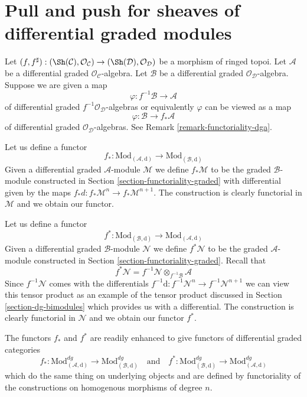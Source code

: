 \section{Pull and push for sheaves of differential graded modules}
\label{section-functoriality-dg}

\noindent
Let $(f, f^\sharp) : (\Sh(\mathcal{C}), \mathcal{O}_\mathcal{C})
\to (\Sh(\mathcal{D}), \mathcal{O}_\mathcal{D})$
be a morphism of ringed topoi. Let $\mathcal{A}$ be a differential
graded $\mathcal{O}_\mathcal{C}$-algebra. Let $\mathcal{B}$ be a
differential graded $\mathcal{O}_\mathcal{D}$-algebra.
Suppose we are given a map
$$
\varphi : f^{-1}\mathcal{B} \to \mathcal{A}
$$
of differential graded $f^{-1}\mathcal{O}_\mathcal{D}$-algebras or equivalently
$\varphi$ can be viewed as a map
$$
\varphi : \mathcal{B} \to f_*\mathcal{A}
$$
of differential graded $\mathcal{O}_\mathcal{D}$-algebras.
See Remark \ref{remark-functoriality-dga}.

\medskip\noindent
Let us define a functor
$$
f_* :
\text{Mod}_{(\mathcal{A}, \text{d})}
\longrightarrow
\text{Mod}_{(\mathcal{B}, \text{d})}
$$
Given a differential graded $\mathcal{A}$-module $\mathcal{M}$ we define
$f_*\mathcal{M}$ to be the graded $\mathcal{B}$-module constructed
in Section \ref{section-functoriality-graded} with differential
given by the maps $f_*d : f_*\mathcal{M}^n \to f_*\mathcal{M}^{n + 1}$.
The construction is clearly functorial in
$\mathcal{M}$ and we obtain our functor.

\medskip\noindent
Let us define a functor
$$
f^* :
\text{Mod}_{(\mathcal{B}, \text{d})}
\longrightarrow
\text{Mod}_{(\mathcal{A}, \text{d})}
$$
Given a differential graded $\mathcal{B}$-module $\mathcal{N}$
we define $f^*\mathcal{N}$ to be the graded $\mathcal{A}$-module
constructed in Section \ref{section-functoriality-graded}. Recall
that
$$
f^*\mathcal{N} = f^{-1}\mathcal{N} \otimes_{f^{-1}\mathcal{B}} \mathcal{A}
$$
Since $f^{-1}\mathcal{N}$ comes with the differentials
$f^{-1}\text{d} : f^{-1}\mathcal{N}^n \to f^{-1}\mathcal{N}^{n + 1}$
we can view this tensor product as an example of the
tensor product discussed in Section \ref{section-dg-bimodules}
which provides us with a differential.
The construction is clearly functorial in
$\mathcal{N}$ and we obtain our functor $f^*$.

\medskip\noindent
The functors $f_*$ and $f^*$ are readily enhanced to give
functors of differential graded categories
$$
f_* :
\text{Mod}^{dg}_{(\mathcal{A}, \text{d})}
\longrightarrow
\text{Mod}^{dg}_{(\mathcal{B}, \text{d})}
\quad\text{and}\quad
f^* :
\text{Mod}^{dg}_{(\mathcal{B}, \text{d})}
\longrightarrow
\text{Mod}^{dg}_{(\mathcal{A}, \text{d})}
$$
which do the same thing on underlying objects and are defined
by functoriality of the constructions on homogenous morphisms
of degree $n$.

